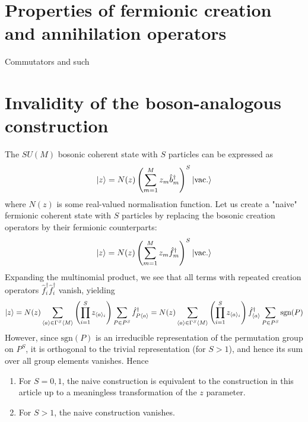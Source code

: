\documentclass[12pt]{article}
\newcommand{\sgn}{\text{sgn}}
\newcommand{\seq}[1]{\langle #1\rangle}
\newcommand{\hc}{^\dagger}
\begin{document}
	\section{Properties of fermionic creation and annihilation operators}
	
	Commutators and such
	
	\section{Invalidity of the boson-analogous construction}
	
	The $SU(M)$ bosonic coherent state with $S$ particles can be expressed as
	\begin{equation}
	\ket{z}=N(z)\left(\sum_{m=1}^Mz_m\hat{b}\hc_m\right)^S\ket{\text{vac.}}
	\end{equation}
	where $N(z)$ is some real-valued normalisation function. Let us create a "naive" fermionic coherent state with $S$ particles by replacing the bosonic creation operators by their fermionic counterparts:
	\begin{equation}
	\ket{z}=N(z)\left(\sum_{m=1}^Mz_m\hat{f}\hc_m\right)^S\ket{\text{vac.}}
	\end{equation}
	Expanding the multinomial product, we see that all terms with repeated creation operators $\hat{f}\hc_i\hat{f}\hc_i$ vanish, yielding
	\begin{equation*}
	\ket{z}=N(z)\sum_{\seq{a}\in\Gamma^S\seq{M}} \left(\prod_{i=1}^S z_{\seq{a}_i}\right) \sum_{P\in P^S} \hat{f}\hc_{P\seq{a}}=N(z)\sum_{\seq{a}\in\Gamma^S\seq{M}} \left(\prod_{i=1}^S z_{\seq{a}_i}\right) \hat{f}\hc_{\seq{a}}\sum_{P\in P^S}\sgn(P)
	\end{equation*}
	However, since $\sgn(P)$ is an irreducible representation of the permutation group on $P^S$, it is orthogonal to the trivial representation (for $S>1$), and hence its sum over all group elements vanishes. Hence
	\begin{enumerate}
		\item For $S=0,1$, the naive construction is equivalent to the construction in this article up to a meaningless transformation of the $z$ parameter.
		\item For $S>1$, the naive construction vanishes.
	\end{enumerate}
	
	
	\begin{thebibliography}{10}



\end{thebibliography}	
	
\end{document}
